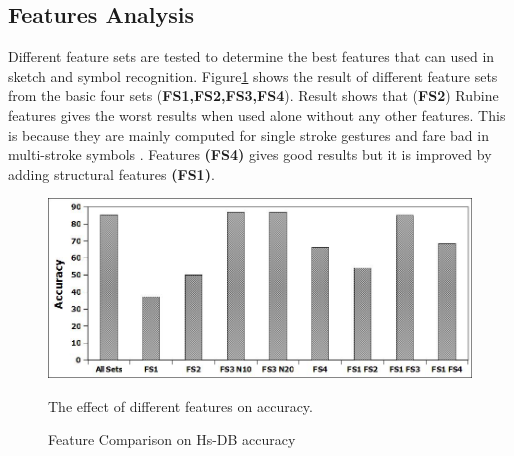 \documentclass[preprint,10pt,5p,twocolumn]{elsarticle}
\begin{document}
\begin{table}
	\centering
 
	\caption{Confusion Matrix of Hs-DB}
	\label{tab:ConfusionMatrix}
\end{table}
%  
\subsection{Features Analysis}
\label{sec:featexp}
Different feature sets are tested to determine the best features that can used in sketch and symbol recognition. Figure\ref{fig:testFeaturesAll} shows the result of different feature sets from the basic four sets (\textbf{FS1,FS2,FS3,FS4}). Result shows that (\textbf{FS2}) Rubine features \cite{gestureexample12} gives the worst results when used alone without any other features. This is because they are mainly computed for single stroke gestures and fare bad in multi-stroke symbols \cite{compareFeaturSVM}. Features \textbf{(FS4)} gives good results but it is improved by adding structural features \textbf{(FS1)}.
 \begin{figure}
	\centering
		\includegraphics[scale=0.5]{images/featuresdifference.jpg}
	\caption{Feature Comparison on Hs-DB accuracy} The effect of different features on accuracy.  %
	\label{fig:testFeaturesAll}
\end{figure}  
\end{document}
